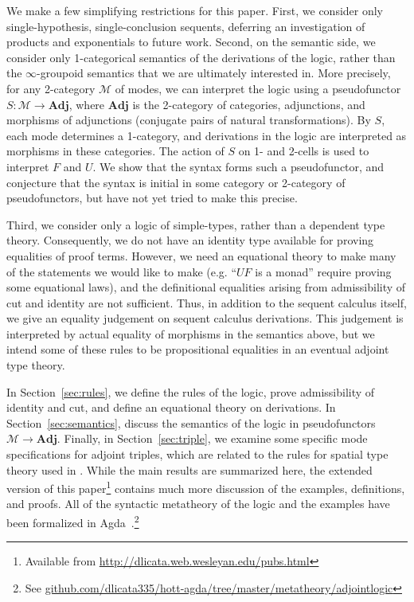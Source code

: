\documentclass{drl-common/llncs}
\newcommand{\M}{\ensuremath{\mathcal{M}}}
\newcommand{\Adj}{\textbf{Adj}}
\begin{document}
We make a few simplifying restrictions for this paper. First, we
consider only single-hypothesis, single-conclusion sequents, deferring
an investigation of products and exponentials to future work.
Second, on the semantic side, we consider only 1-categorical semantics
of the derivations of the logic, rather than the $\infty$-groupoid
semantics that we are ultimately interested in.  More precisely, for any
2-category \M\/ of modes, we can interpret the logic using a
pseudofunctor $S : \M \to \Adj$, where $\Adj$ is the 2-category of
categories, adjunctions, and morphisms of adjunctions (conjugate pairs
of natural transformations).  By $S$, each mode determines a 1-category,
and derivations in the logic are interpreted as morphisms in these
categories.  The action of $S$ on 1- and 2-cells is used to interpret
$F$ and $U$.  We show that the syntax forms such a pseudofunctor, and
conjecture that the syntax is initial in some category or 2-category of
pseudofunctors, but have not yet tried to make this precise.

Third, we consider only a logic of simple-types, rather than a dependent
type theory.  Consequently, we do not have an identity type available
for proving equalities of proof terms.  However, we need an equational
theory to make many of the statements we would like to make (e.g. ``$UF$ is a monad''
require proving some equational laws), and the definitional equalities
arising from admissibility of cut and identity are not sufficient.
Thus, in addition to the sequent calculus itself, we give an equality
judgement on sequent calculus derivations.  This judgement is
interpreted by actual equality of morphisms in the semantics above, but
we intend some of these rules to be propositional equalities in an eventual
adjoint type theory.

In Section~\ref{sec:rules}, we define the rules of the logic, prove
admissibility of identity and cut, and define an equational theory on
derivations.  In Section~\ref{sec:semantics}, discuss the semantics of
the logic in pseudofunctors $\M \to \Adj$.  Finally, in
Section~\ref{sec:triple}, we examine some specific mode specifications
for adjoint triples, which are related to the rules for spatial type
theory used in \citep{shulman15realcohesion}.  While the main results
are summarized here, the extended version of this
paper\footnote{Available from
  \url{http://dlicata.web.wesleyan.edu/pubs.html}}  contains much more
discussion of the examples, definitions, and proofs.  All of the
syntactic metatheory of the logic and the examples have been formalized
in Agda~\citep{norell07thesis}.\footnote{See
  \url{github.com/dlicata335/hott-agda/tree/master/metatheory/adjointlogic}}
\end{document}
